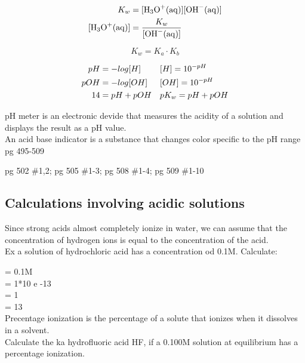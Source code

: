 \documentclass{article}
\begin{document}
\begin{center}
  \begin{align*}
    K_w&=\ce{[H3O+(aq)][OH^-(aq)]}\\
    \ce{[H3O+(aq)]}&=\frac{K_w}{\ce{[OH^-(aq)]}}
  \end{align*}
\end{center}
\begin{center}
  \begin{equation*}
   K_w=K_a\cdot{K_b}
    \end{equation*}
\end{center} 
\begin{center}
\begin{align*}
pH&=-log[H]&&
[H]=10^{-pH}\\
 pOH&=-log[OH]&&
 [OH]=10^{-pH}\\
 \vspace{4mm}
 14&=pH+pOH &&
 pK_w = pH + pOH 
\end{align*}
\end{center}

pH meter is an electronic devide that measures the acidity of a solution and displays the result as a pH value.\\

An acid base indicator is a substance that changes color specific to the pH range\\

pg 495-509

pg 502 \#1,2;
pg 505 \#1-3;
pg 508 \#1-4;
pg 509 \#1-10

\newpage
 
\subsection{Calculations involving acidic solutions}

Since strong acids almost completely ionize in water, we can assume that the concentration of hydrogen ions is equal to the concentration of the acid.\\

Ex a solution of hydrochloric acid has a concentration od 0.1M. Calculate:
\vspace{4mm}
\\
\begin{center}
\end{center}
\ce{[H+]} = 0.1M \\
\ce{[OH^-]} = 1*10 e -13\\
 = 1\\
 = 13\\

Precentage ionization is the percentage of a solute that ionizes when it dissolves in a solvent.\\

 
Calculate the ka hydrofluoric acid HF, if a 0.100M solution at equilibrium has a percentage ionization.

\end{document}
